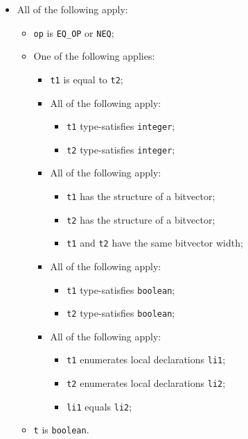 \documentclass{book}
\begin{document}
\begin{itemize}
  \item All of the following apply:
    \begin{itemize}
    \item \texttt{op} is \texttt{EQ\_OP} or \texttt{NEQ};
    \item One of the following applies:
      \begin{itemize}
      \item \texttt{t1} is equal to \texttt{t2};
      \item All of the following apply:
        \begin{itemize}
        \item \texttt{t1} type-satisfies \texttt{integer};
        \item \texttt{t2} type-satisfies \texttt{integer}; 
        \end{itemize}
      \item All of the following apply:
        \begin{itemize}
        \item \texttt{t1} has the structure of a bitvector;
        \item \texttt{t2} has the structure of a bitvector;
        \item \texttt{t1} and \texttt{t2} have the same bitvector width;
        \end{itemize}
      \item All of the following apply:
        \begin{itemize}
        \item \texttt{t1} type-satisfies \texttt{boolean};
        \item \texttt{t2} type-satisfies \texttt{boolean};
        \end{itemize}
      \item All of the following apply:
        \begin{itemize}
        \item \texttt{t1} enumerates local declarations \texttt{li1}; 
        \item \texttt{t2} enumerates local declarations \texttt{li2};
        \item \texttt{li1} equals \texttt{li2};
        \end{itemize}
      \end{itemize}
    \item \texttt{t} is \texttt{boolean}.
    \end{itemize}
   

\end{itemize}
\end{document}
